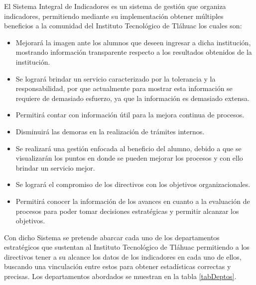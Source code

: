 	El Sistema Integral de Indicadores es un sistema de gesti\'on que organiza indicadores, permitiendo mediante su implementaci\'on obtener m\'ultiples beneficios a la comunidad del Instituto Tecnol\'ogico de Tl\'ahuac los cuales son:
	\begin{itemize}
		\item Mejorar\'a la imagen ante los alumnos que deseen ingresar a dicha instituci\'on, mostrando informaci\'on transparente respecto a los resultados obtenidos de la instituci\'on.
		\item Se lograr\'a brindar un servicio caracterizado por la tolerancia y la responsabilidad, por que actualmente para mostrar esta informaci\'on se requiere de demasiado esfuerzo, ya que la informaci\'on es demasiado extensa.
		\item Permitir\'a contar con informaci\'on \'util para la mejora continua de procesos.
		\item Disminuir\'a las demoras en la realizaci\'on de tr\'amites internos.
		\item Se realizar\'a una gesti\'on enfocada al beneficio del alumno, debido a que se visualizar\'an los puntos en donde se pueden mejorar los procesos y con ello brindar un servicio mejor.
		\item Se lograr\'a el compromiso de los directivos con los objetivos organizacionales.
		\item Permitir\'a conocer la informaci\'on de los avances en cuanto a la evaluaci\'on de procesos para poder tomar decisiones  estrat\'egicas y permitir alcanzar los objetivos.
	\end{itemize}

	Con dicho Sistema se pretende abarcar cada uno de los departamentos estrat\'egicos que sustentan al Instituto Tecnol\'ogico de Tl\'ahuac permitiendo a los directivos tener a su alcance los datos de los indicadores en cada uno de ellos, buscando una vinculaci\'on entre estos para obtener estad\'isticas correctas y precisas. Los departamentos abordados se muestran en la tabla \ref{tabDeptos}.

